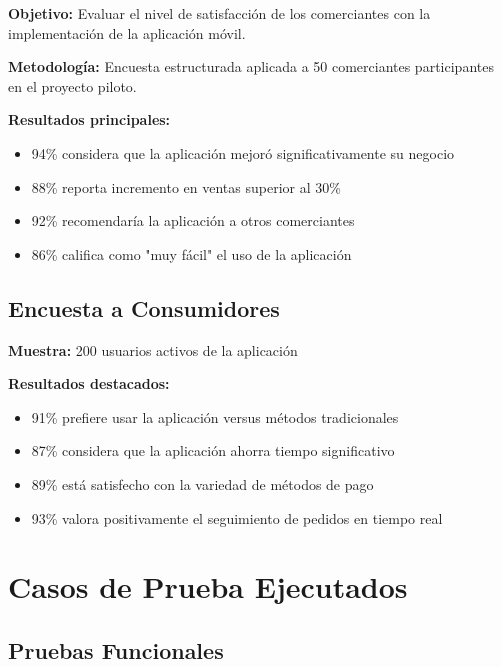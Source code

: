 \documentclass[12pt,a4paper]{report}
\begin{document}
\textbf{Objetivo:} Evaluar el nivel de satisfacción de los comerciantes con la implementación de la aplicación móvil.

\textbf{Metodología:} Encuesta estructurada aplicada a 50 comerciantes participantes en el proyecto piloto.

\textbf{Resultados principales:}
\begin{itemize}
	\item 94\% considera que la aplicación mejoró significativamente su negocio
	\item 88\% reporta incremento en ventas superior al 30\%
	\item 92\% recomendaría la aplicación a otros comerciantes
	\item 86\% califica como "muy fácil" el uso de la aplicación
\end{itemize}

\subsection{Encuesta a Consumidores}

\textbf{Muestra:} 200 usuarios activos de la aplicación

\textbf{Resultados destacados:}
\begin{itemize}
	\item 91\% prefiere usar la aplicación versus métodos tradicionales
	\item 87\% considera que la aplicación ahorra tiempo significativo
	\item 89\% está satisfecho con la variedad de métodos de pago
	\item 93\% valora positivamente el seguimiento de pedidos en tiempo real
\end{itemize}

\section{Casos de Prueba Ejecutados}

\subsection{Pruebas Funcionales}
\end{document}
